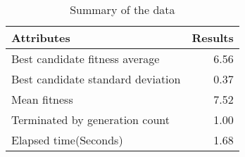 \begin{table}[ht]
\centering
\begin{tabular}{lr}
  \hline
Attributes & Results \\ 
  \hline
Best candidate fitness average & 6.56 \\ 
  Best candidate standard deviation & 0.37 \\ 
  Mean fitness & 7.52 \\ 
  Terminated by generation count & 1.00 \\ 
  Elapsed time(Seconds) & 1.68 \\ 
   \hline
\end{tabular}
\caption{Summary of the data} 
\label{table:summary}
\end{table}
